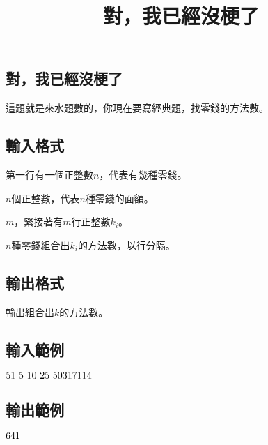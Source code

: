 \documentclass{article}
\title{對，我已經沒梗了}
\begin{document}
\begin{CJK*}{UTF8}{bsmi}

\maketitle

\section*{對，我已經沒梗了}

這題就是來水題數的，你現在要寫經典題，找零錢的方法數。

\subsection*{輸入格式}
第一行有一個正整數$n$，代表有幾種零錢。

$n$個正整數，代表$n$種零錢的面額。

$m$，緊接著有$m$行正整數$k_i$。

$n$種零錢組合出$k_i$的方法數，以行分隔。

\subsection*{輸出格式}
輸出組合出$k$的方法數。

\subsection*{輸入範例}
$5\\1\ 5\ 10\ 25\ 50\\3\\17\\11\\4$

\subsection*{輸出範例}
$6\\4\\1$

\end{CJK*}
\end{document}
